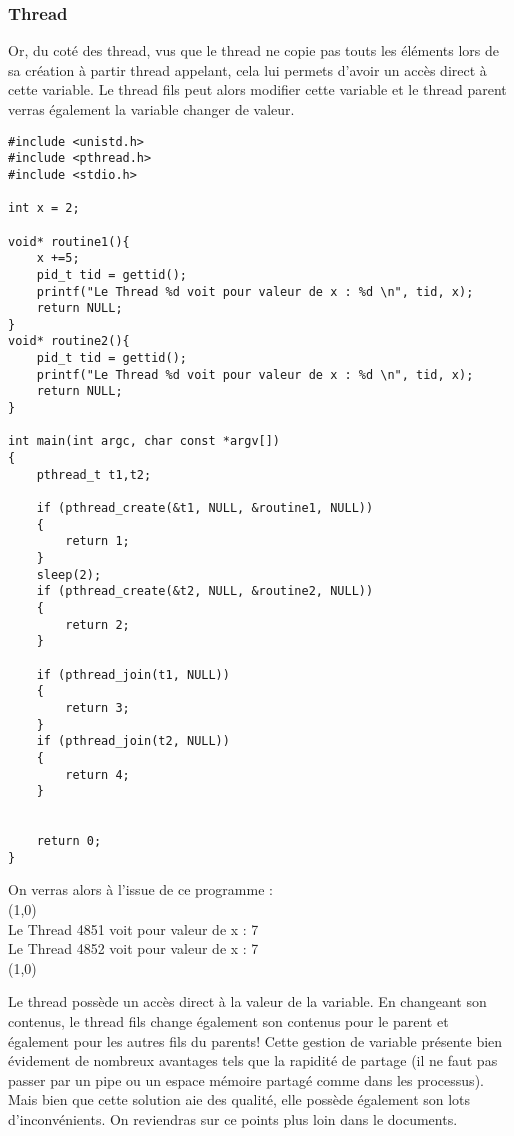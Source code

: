 \subsubsection{Thread}

Or, du coté des thread, vus que le thread ne copie pas touts les éléments lors de sa création à partir thread appelant, cela lui permets d'avoir un accès direct à cette variable. Le thread fils peut alors modifier cette variable et le thread parent verras également la variable changer de valeur. 
\\
\begin{lstlisting}[title = Variable globale thread]
#include <unistd.h>
#include <pthread.h>
#include <stdio.h>

int x = 2;

void* routine1(){
	x +=5;
	pid_t tid = gettid();
	printf("Le Thread %d voit pour valeur de x : %d \n", tid, x);
    return NULL;
}
void* routine2(){
	pid_t tid = gettid();
	printf("Le Thread %d voit pour valeur de x : %d \n", tid, x);
    return NULL;
}

int main(int argc, char const *argv[])
{
	pthread_t t1,t2;

	if (pthread_create(&t1, NULL, &routine1, NULL))
	{
		return 1;
	}
    sleep(2);
	if (pthread_create(&t2, NULL, &routine2, NULL))
	{
		return 2;
	}

	if (pthread_join(t1, NULL))
	{
		return 3;
	}
	if (pthread_join(t2, NULL))
	{
		return 4;
	}


	return 0;
}
\end{lstlisting}
\vspace{\baselineskip}

On verras alors à l'issue de ce programme : 
\\
\line(1,0){\linewidth}
\\
Le Thread 4851 voit pour valeur de x : 7\\
Le Thread 4852 voit pour valeur de x : 7
\\
\line(1,0){\linewidth}

Le thread possède un accès direct à la valeur de la variable. En changeant son contenus, le thread fils change également son contenus pour le parent et également pour les autres fils du parents! Cette gestion de variable présente bien évidement de nombreux avantages tels que la rapidité de partage (il ne faut pas passer par un pipe ou un espace mémoire partagé comme dans les processus). Mais bien que cette solution aie des qualité, elle possède également son lots d'inconvénients. On reviendras sur ce points plus loin dans le documents.

